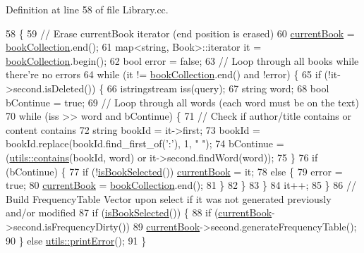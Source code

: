 Definition at line 58 of file Library.\+cc.


\begin{DoxyCode}
58                                      \{
59     \textcolor{comment}{// Erase currentBook iterator (end position is erased)}
60     \hyperlink{class_library_a78a4071e8d610da671b3886c71900dae}{currentBook} = \hyperlink{class_library_a5807d6d006ac0aa0a184831f0f2e5415}{bookCollection}.end();
61     map<string, Book>::iterator it = \hyperlink{class_library_a5807d6d006ac0aa0a184831f0f2e5415}{bookCollection}.begin();
62     \textcolor{keywordtype}{bool} error = \textcolor{keyword}{false};
63     \textcolor{comment}{// Loop through all books while there're no errors}
64     \textcolor{keywordflow}{while} (it != \hyperlink{class_library_a5807d6d006ac0aa0a184831f0f2e5415}{bookCollection}.end() and !error) \{
65         \textcolor{keywordflow}{if} (!it->second.isDeleted()) \{
66             istringstream iss(query);
67             \textcolor{keywordtype}{string} word;
68             \textcolor{keywordtype}{bool} bContinue = \textcolor{keyword}{true};
69             \textcolor{comment}{// Loop through all words (each word must be on the text)}
70             \textcolor{keywordflow}{while} (iss >> word and bContinue) \{
71                 \textcolor{comment}{// Check if author/title contains or content contains}
72                 \textcolor{keywordtype}{string} bookId = it->first;
73                 bookId = bookId.replace(bookId.find\_first\_of(\textcolor{charliteral}{':'}), 1, \textcolor{stringliteral}{" "});
74                 bContinue = (\hyperlink{namespaceutils_aaaff51c00798a6c05a15f4ecd0f02e9e}{utils::contains}(bookId, word) or it->second.findWord(word));
75             \}
76             if (bContinue) \{
77                 \textcolor{keywordflow}{if} (!\hyperlink{class_library_a04ff0757054c2813e89036cdd3f7f91f}{isBookSelected}()) \hyperlink{class_library_a78a4071e8d610da671b3886c71900dae}{currentBook} = it;
78                 \textcolor{keywordflow}{else} \{
79                     error = \textcolor{keyword}{true};
80                     \hyperlink{class_library_a78a4071e8d610da671b3886c71900dae}{currentBook} = \hyperlink{class_library_a5807d6d006ac0aa0a184831f0f2e5415}{bookCollection}.end();
81                 \}
82             \}
83         \}
84         it++;
85     \}
86     \textcolor{comment}{// Build FrequencyTable Vector upon select if it was not generated previously and/or modified}
87     \textcolor{keywordflow}{if} (\hyperlink{class_library_a04ff0757054c2813e89036cdd3f7f91f}{isBookSelected}()) \{
88         \textcolor{keywordflow}{if} (\hyperlink{class_library_a78a4071e8d610da671b3886c71900dae}{currentBook}->second.isFrequencyDirty())
89             \hyperlink{class_library_a78a4071e8d610da671b3886c71900dae}{currentBook}->second.generateFrequencyTable();
90     \} \textcolor{keywordflow}{else} \hyperlink{namespaceutils_afd76dd21b41c50ce7396e30fb5d8d75b}{utils::printError}();
91 \}
\end{DoxyCode}
